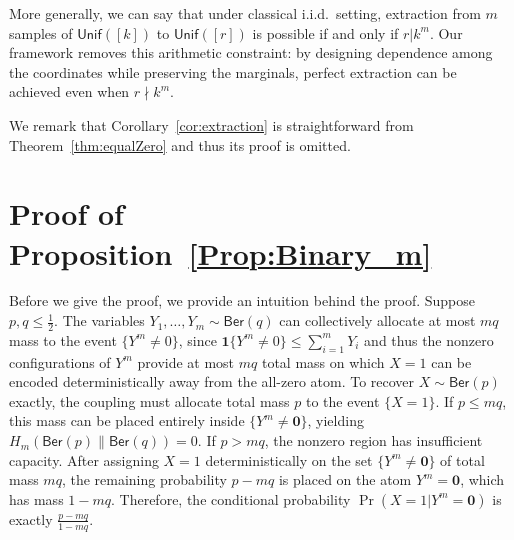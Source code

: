 \documentclass[journal]{IEEEtran}
\newcommand{\1}{\mathbf{1}}
\newcommand{\Ber}{\mathsf{Ber}}
\newcommand{\Unif}{\mathsf{Unif}}
\begin{document}
More generally, we can say that under classical i.i.d.\ setting, extraction from $m$ samples of $\Unif([k])$ to $\Unif([r])$ is possible if and only if $r| k^m$. Our framework removes this arithmetic constraint: by designing dependence among the coordinates while preserving the marginals, perfect extraction can be achieved even when $r \nmid k^m$. 

We remark that Corollary~\ref{cor:extraction} is straightforward from Theorem~\ref{thm:equalZero} and thus its proof is omitted. 


\section{Proof of Proposition~\ref{Prop:Binary_m}}\label{app:examples}
Before we give the proof, we provide an intuition behind the proof. 
Suppose $p,q\le \tfrac12$. The variables $Y_1,\dots,Y_m\sim \Ber(q)$ can collectively allocate at most $mq$ mass to the event $\{Y^m\neq 0\}$, since $\mathbf{1}\{Y^m\neq 0\}\le \sum_{i=1}^m Y_i$ and thus  the nonzero configurations of $Y^m$ provide at most $mq$ total mass on
which $X=1$ can be encoded deterministically away from the all-zero atom. To
recover $X\sim\Ber(p)$ exactly, the coupling must allocate total mass $p$ to
the event $\{X=1\}$. If $p\le mq$, this mass can be placed entirely inside
$\{Y^m\neq \mathbf 0\}$, yielding $H_m(\Ber(p)\|\Ber(q))=0$. If $p>mq$, the nonzero region has insufficient capacity. 
After assigning $X=1$ deterministically on the set $\{Y^m \neq \mathbf{0}\}$ of total mass $mq$, the remaining probability $p-mq$ is placed on the atom $Y^m=\mathbf{0}$, which has mass $1-mq$. Therefore, the conditional probability $\Pr(X=1|Y^m=\mathbf{0})$ is exactly $\frac{p-mq}{1-mq}$.
\end{document}
